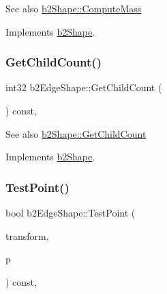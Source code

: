 \begin{DoxySeeAlso}{See also}
\mbox{\hyperlink{classb2Shape_a61b365526241b47f124789b0309cac69}{b2\+Shape\+::\+Compute\+Mass}} 
\end{DoxySeeAlso}


Implements \mbox{\hyperlink{classb2Shape_a61b365526241b47f124789b0309cac69}{b2\+Shape}}.

\mbox{\label{classb2EdgeShape_ae9dcaa2f4b77fcf182d29159658da82a}} 
\subsubsection{\texorpdfstring{Get\+Child\+Count()}{GetChildCount()}}
{\footnotesize\ttfamily int32 b2\+Edge\+Shape\+::\+Get\+Child\+Count (\begin{DoxyParamCaption}{ }\end{DoxyParamCaption}) const\hspace{0.3cm}{\ttfamily [override]}, {\ttfamily [virtual]}}

\begin{DoxySeeAlso}{See also}
\mbox{\hyperlink{classb2Shape_a05a3c445017d96df9238ceefe6ce37ab}{b2\+Shape\+::\+Get\+Child\+Count}} 
\end{DoxySeeAlso}


Implements \mbox{\hyperlink{classb2Shape_a05a3c445017d96df9238ceefe6ce37ab}{b2\+Shape}}.

\mbox{\label{classb2EdgeShape_a15151673cf9ad585779c70363425f470}} 
\subsubsection{\texorpdfstring{Test\+Point()}{TestPoint()}}
{\footnotesize\ttfamily bool b2\+Edge\+Shape\+::\+Test\+Point (\begin{DoxyParamCaption}\item[{const \mbox{\hyperlink{structb2Transform}{b2\+Transform}} \&}]{transform,  }\item[{const \mbox{\hyperlink{structb2Vec2}{b2\+Vec2}} \&}]{p }\end{DoxyParamCaption}) const\hspace{0.3cm}{\ttfamily [override]}, {\ttfamily [virtual]}}


